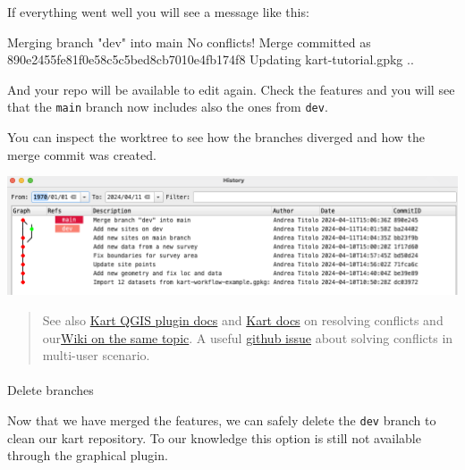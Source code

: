 \documentclass[
  letterpaper,
  DIV=11,
  numbers=noendperiod]{scrartcl}
\makeatletter
\let\oldparagraph\paragraph
\renewcommand{\paragraph}{
    \@ifstar
      \xxxParagraphStar
      \xxxParagraphNoStar
  }
\newcommand{\xxxParagraphStar}[1]{\oldparagraph*{#1}\mbox{}}
\newcommand{\xxxParagraphNoStar}[1]{\oldparagraph{#1}\mbox{}}
\newenvironment{Shaded}{\begin{snugshade}}{\end{snugshade}}
\newcommand{\ExtensionTok}[1]{\textcolor[rgb]{0.55,0.91,0.99}{#1}}
\newcommand{\NormalTok}[1]{\textcolor[rgb]{0.97,0.97,0.95}{#1}}
\newcommand{\StringTok}[1]{\textcolor[rgb]{0.95,0.98,0.55}{#1}}
\makeatother
\begin{document}
If everything went well you will see a message like this:

\begin{Shaded}
\begin{Highlighting}[]
\ExtensionTok{Merging}\NormalTok{ branch }\StringTok{"dev"}\NormalTok{ into main}
\ExtensionTok{No}\NormalTok{ conflicts!}
\ExtensionTok{Merge}\NormalTok{ committed as 890e2455fe81f0e58c5c5bed8cb7010e4fb174f8}
\ExtensionTok{Updating}\NormalTok{ kart{-}tutorial.gpkg ..}
\end{Highlighting}
\end{Shaded}

And your repo will be available to edit again. Check the features and
you will see that the \texttt{main} branch now includes also the ones
from \texttt{dev}.

You can inspect the worktree to see how the branches diverged and how
the merge commit was created.

\begin{center}
\includegraphics{img/kart-panel-merge-result.png}
\end{center}

\begin{quote}
See also
\href{https://github.com/koordinates/kart-qgis-plugin/blob/main/docs/index.md\#working-with-branches}{Kart
QGIS plugin docs} and
\href{https://docs.kartproject.org/en/latest/pages/command_reference.html\#resolving-conflicts}{Kart
docs} on resolving conflicts and
our\href{https://github.com/UnitoAssyrianGovernance/.github/wiki/GIS-Vector-Data\#dealing-with-conflicts}{Wiki
on the same topic}. A useful
\href{https://github.com/koordinates/kart/issues/814}{github issue}
about solving conflicts in multi-user scenario.
\end{quote}

\paragraph{Delete branches}\label{delete-branches}

Now that we have merged the features, we can safely delete the
\texttt{dev} branch to clean our kart repository. To our knowledge this
option is still not available through the graphical plugin.
\end{document}
